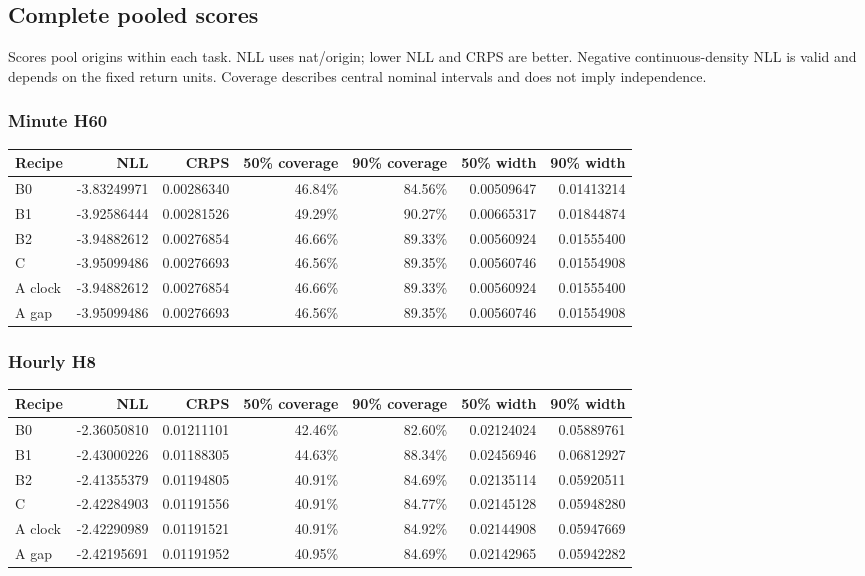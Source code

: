 \documentclass[10pt,a4paper]{article}
\begin{document}
\subsection{Complete pooled scores}\label{complete-pooled-scores}

Scores pool origins within each task. NLL uses nat/origin; lower NLL and CRPS are better. Negative continuous-density NLL is valid and depends on the fixed return units. Coverage describes central nominal intervals and does not imply independence.

\subsubsection{Minute H60}\label{minute-h60}

\begin{longtable}[]{@{}lrrrrrr@{}}
\toprule\noalign{}
Recipe & NLL & CRPS & 50\% coverage & 90\% coverage & 50\% width & 90\% width \\
\midrule\noalign{}
\endhead
\bottomrule\noalign{}
\endlastfoot
B0 & -3.83249971 & 0.00286340 & 46.84\% & 84.56\% & 0.00509647 & 0.01413214 \\
B1 & -3.92586444 & 0.00281526 & 49.29\% & 90.27\% & 0.00665317 & 0.01844874 \\
B2 & -3.94882612 & 0.00276854 & 46.66\% & 89.33\% & 0.00560924 & 0.01555400 \\
C & -3.95099486 & 0.00276693 & 46.56\% & 89.35\% & 0.00560746 & 0.01554908 \\
A clock & -3.94882612 & 0.00276854 & 46.66\% & 89.33\% & 0.00560924 & 0.01555400 \\
A gap & -3.95099486 & 0.00276693 & 46.56\% & 89.35\% & 0.00560746 & 0.01554908 \\
\end{longtable}

\subsubsection{Hourly H8}\label{hourly-h8}

\begin{longtable}[]{@{}lrrrrrr@{}}
\toprule\noalign{}
Recipe & NLL & CRPS & 50\% coverage & 90\% coverage & 50\% width & 90\% width \\
\midrule\noalign{}
\endhead
\bottomrule\noalign{}
\endlastfoot
B0 & -2.36050810 & 0.01211101 & 42.46\% & 82.60\% & 0.02124024 & 0.05889761 \\
B1 & -2.43000226 & 0.01188305 & 44.63\% & 88.34\% & 0.02456946 & 0.06812927 \\
B2 & -2.41355379 & 0.01194805 & 40.91\% & 84.69\% & 0.02135114 & 0.05920511 \\
C & -2.42284903 & 0.01191556 & 40.91\% & 84.77\% & 0.02145128 & 0.05948280 \\
A clock & -2.42290989 & 0.01191521 & 40.91\% & 84.92\% & 0.02144908 & 0.05947669 \\
A gap & -2.42195691 & 0.01191952 & 40.95\% & 84.69\% & 0.02142965 & 0.05942282 \\
\end{longtable}
\end{document}
